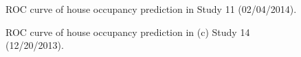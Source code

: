 \begin{figure}[h]
	\caption{
	ROC curve of house occupancy prediction in Study 11 (02/04/2014).
}
	\label{fig_rocresults_2}
\end{figure}

\begin{figure}[h]
	\caption{
	ROC curve of house occupancy prediction in (c) Study 14 (12/20/2013).
}
	\label{fig_rocresults_3}
\end{figure}



